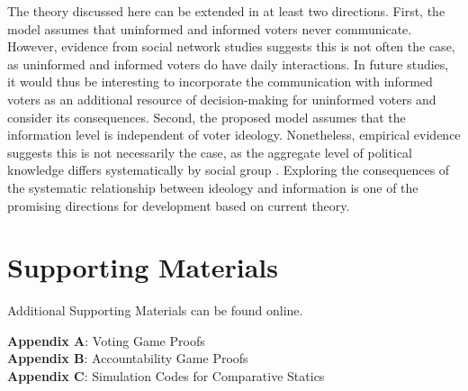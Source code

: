 \documentclass[doc,natbib,12pt]{apa6}
\begin{document}
	\par The theory discussed here can be extended in at least two directions. First, the model assumes that uninformed and informed voters never communicate. However, evidence from social network studies \citep{Huckfeldt2001thso} suggests this is not often the case, as uninformed and informed voters do have daily interactions. In future studies, it would thus be interesting to incorporate the communication with informed voters as an additional resource of decision-making for uninformed voters and consider its consequences. Second, the proposed model assumes that the information level is independent of voter ideology. Nonetheless, empirical evidence suggests this is not necessarily the case, as the aggregate level of political knowledge differs systematically by social group \citep{Dellicarpini1996wham, Althaus2003copr}. Exploring the consequences of the systematic relationship between ideology and information is one of the promising directions for development based on current theory.
	
	
	
	\section{Supporting Materials}
	
	Additional Supporting Materials can be found online.%
	
	\noindent \textbf{Appendix A}: Voting Game Proofs \\
	\noindent \textbf{Appendix B}: Accountability Game Proofs \\
	\noindent \textbf{Appendix C}: Simulation Codes for Comparative Statics \\
	
	
	
\end{document}
